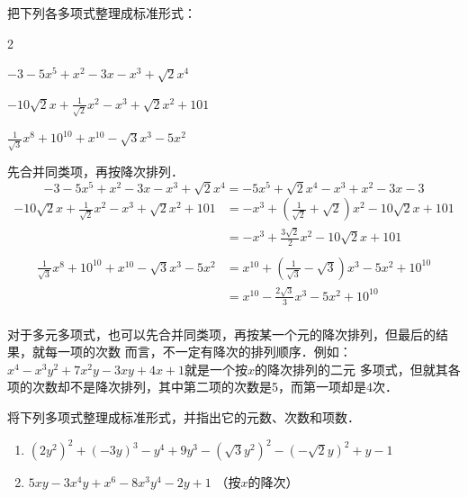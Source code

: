 \begin{example}
    把下列各多项式整理成标准形式：
    \begin{enumerate}
        \begin{multicols}{2}
            
       
        \item $-3-5x^5+x^2-3x-x^3+\sqrt{2}x^4$
        \item $-10\sqrt{2}x+\frac{1}{\sqrt{2}}x^2-x^3+\sqrt{2}x^2+101$
        \item $\frac{1}{\sqrt{3}}x^8+10^{10}+x^{10}-\sqrt{3}x^3-5x^2$
    \end{multicols} 
\end{enumerate}
\end{example}

\begin{solution}
    先合并同类项，再按降次排列．
\[
   -3-5x^5+x^2-3x-x^3+\sqrt{2}x^4=-5x^5+\sqrt{2}x^4-x^3+x^2-3x-3
\]
\[\begin{split}
  -10\sqrt{2}x+\frac{1}{\sqrt{2}}x^2-x^3+\sqrt{2}x^2+101
    &=-x^3+\left(\frac{1}{\sqrt{2}}+\sqrt{2}\right)x^2-10\sqrt{2}x+101\\
    &=-x^3+\frac{3\sqrt{2}}{2}x^2-10\sqrt{2}x+101\\
\end{split}\]
\[\begin{split}
  \frac{1}{\sqrt{3}}x^8+10^{10}+x^{10}-\sqrt{3}x^3-5x^2
    &=x^{10}+\left(\frac{1}{\sqrt{3}}-\sqrt{3}\right)x^3-5x^2+10^{10}\\
    &=x^{10}-\frac{2\sqrt{3}}{3}x^3-5x^2+10^{10}\\
\end{split}\]

\end{solution}

对于多元多项式，也可以先合并同类项，再按某一个元的降次排列，但最后的结果，就每一项的次数
而言，不一定有降次的排列顺序．例如：$x^4-x^3y^2+7x^2y-3xy+4x+1$就是一个按$x$的降次排列的二元
多项式，但就其各项的次数却不是降次排列，其中第二项的次数是5，而第一项却是4次．

\begin{ex}
    将下列多项式整理成标准形式，并指出它的元数、次数和项数．
    \begin{enumerate}
        \item $(2y^2)^2+(-3y)^3-y^4+9y^3-\left(\sqrt{3}y^2\right)^2-\left(-\sqrt{2}y\right)^2+y-1$
        \item $5xy-3x^4y+x^6-8x^3y^4-2y+1$ （按$x$的降次）
    \end{enumerate}
\end{ex}

